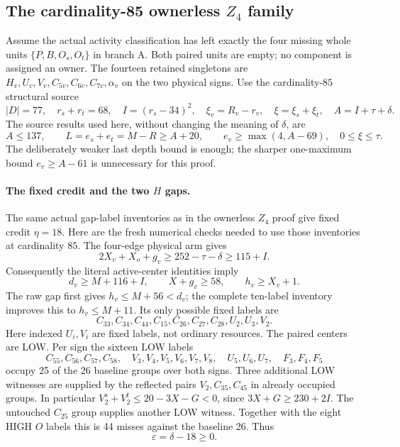 \subsection{The cardinality-85 ownerless $Z_4$ family}

Assume the actual activity classification has left exactly the four
missing whole units $\{P,B,O_s,O_t\}$ in branch A. Both paired units
are empty; no component is assigned an owner. The fourteen retained
singletons are $H_v,U_v,V_v,C_{5v},C_{6v},C_{7v},\alpha_v$ on the two
physical signs. Use the cardinality-$85$ structural source
\[
 |D|=77,\quad r_s+r_t=68,\quad
 I=(r_s-34)^2,\quad \xi_v=R_v-r_v,\quad \xi=\xi_s+\xi_t,
 \quad A=I+\tau+\delta.
\]
The source results used here, without changing the meaning of $\delta$,
are
\begin{equation}\label{eq:85-ownerless-source}
 A\le137,\qquad L=e_s+e_t=M-R\ge A+20,
 \qquad e_v\ge\max(4,A-69),\quad 0\le\xi\le\tau.
\end{equation}
The deliberately weaker last depth bound is enough; the sharper
one-maximum bound $e_v\ge A-61$ is unnecessary for this proof.

\paragraph{The fixed credit and the two $H$ gaps.}
The same actual gap-label inventories as in the ownerless $Z_4$ proof
give fixed credit $\eta=18$. Here are the fresh numerical checks needed
to use those inventories at cardinality $85$. The four-edge physical
arm gives
\[
 2X_v+X_o+g_v\ge252-\tau-\delta\ge115+I.
\]
Consequently the literal active-center identities imply
\[
 d_v\ge M+116+I,\qquad X+g_v\ge58,\qquad h_v\ge X_v+1.
\]
The raw gap first gives $h_v\le M+56<d_v$; the complete ten-label
inventory improves this to $h_v\le M+11$. Its only possible fixed
labels are
\[
 C_{33},C_{34},C_{44},C_{15},C_{26},C_{27},C_{28},U_2,U_3,V_2.
\]
Here indexed $U_i,V_i$ are fixed labels, not ordinary resources.
The paired centers are LOW. Per sign the sixteen LOW labels
\[
 C_{55},C_{56},C_{57},C_{58},\quad V_3,V_4,V_5,V_6,V_7,V_8,
 \quad U_5,U_6,U_7,\quad F_3,F_4,F_5
\]
occupy 25 of the 26 baseline groups over both signs. Three additional
LOW witnesses are supplied by the reflected pairs $V_2,C_{35},C_{45}$
in already occupied groups. In particular
$V_2^s+V_2^t\le20-3X-G<0$, since
$3X+G\ge230+2I$. The untouched $C_{25}$ group supplies another
LOW witness. Together with the eight HIGH $O$ labels this is 44
misses against the baseline 26. Thus
\[
 \varepsilon=\delta-18\ge0.
\]

